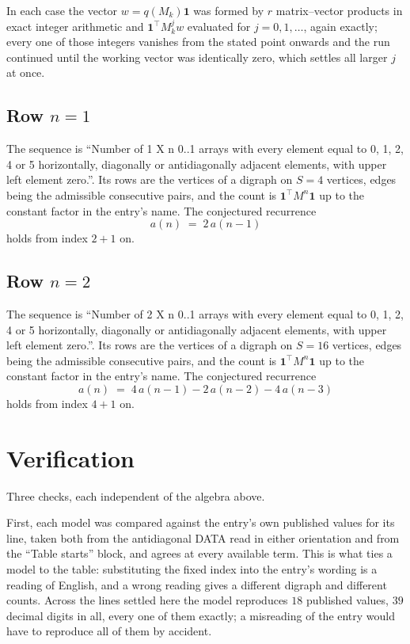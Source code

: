 \documentclass[11pt,a4paper]{article}
\theoremstyle{plain}
\theoremstyle{definition}
\begin{document}
In each case the vector $w=q(M_k)\mathbf{1}$ was formed by $r$ matrix--vector products in
exact integer arithmetic and $\mathbf{1}^{\!\top}M_k^{j}w$ evaluated for $j=0,1,\dots$,
again exactly; every one of those integers vanishes from the stated point onwards and the run
continued until the working vector was identically zero, which settles all larger $j$ at once.

\subsection*{Row $n$$=1$}
The sequence is ``Number of 1 X n 0..1 arrays with every element equal to 0, 1, 2, 4 or 5 horizontally, diagonally or antidiagonally adjacent elements, with upper left element zero.''. Its rows are the vertices of a digraph on
$S=4$ vertices, edges being the admissible consecutive pairs, and the count is
$\mathbf{1}^{\!\top}M^{n}\mathbf{1}$ up to the constant factor in the entry's name.
The conjectured recurrence
\[
a(n)\;=\;2\,a(n-1)
\]
holds from index $2+1$ on.

\subsection*{Row $n$$=2$}
The sequence is ``Number of 2 X n 0..1 arrays with every element equal to 0, 1, 2, 4 or 5 horizontally, diagonally or antidiagonally adjacent elements, with upper left element zero.''. Its rows are the vertices of a digraph on
$S=16$ vertices, edges being the admissible consecutive pairs, and the count is
$\mathbf{1}^{\!\top}M^{n}\mathbf{1}$ up to the constant factor in the entry's name.
The conjectured recurrence
\[
a(n)\;=\;4\,a(n-1) - 2\,a(n-2) - 4\,a(n-3)
\]
holds from index $4+1$ on.

\section{Verification}

Three checks, each independent of the algebra above.

First, each model was compared against the entry's own published values for its line, taken
both from the antidiagonal DATA read in either orientation and from the ``Table starts''
block, and agrees at every available term. This is what ties a model to the table:
substituting the fixed index into the entry's wording is a reading of English, and a wrong
reading gives a different digraph and different counts. Across the lines settled here the
model reproduces $18$ published values, $39$ decimal digits in all, every one of
them exactly; a misreading of the entry would have to reproduce all of them by accident.
\end{document}
